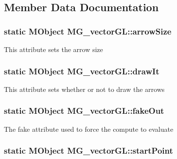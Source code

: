 \subsection{Member Data Documentation}
\hypertarget{class_m_g__vector_g_l_a51ce57b6d4cac43cf6b9fbdf377691c4}{
\subsubsection[{arrow\-Size}]{\setlength{\rightskip}{0pt plus 5cm}static M\-Object M\-G\-\_\-vector\-G\-L\-::arrow\-Size\hspace{0.3cm}{\ttfamily [static]}}}\label{class_m_g__vector_g_l_a51ce57b6d4cac43cf6b9fbdf377691c4}
This attribute sets the arrow size \hypertarget{class_m_g__vector_g_l_a5d59b4c3dfc50250558acfabca45a260}{
\subsubsection[{draw\-It}]{\setlength{\rightskip}{0pt plus 5cm}static M\-Object M\-G\-\_\-vector\-G\-L\-::draw\-It\hspace{0.3cm}{\ttfamily [static]}}}\label{class_m_g__vector_g_l_a5d59b4c3dfc50250558acfabca45a260}
This attribute sets whether or not to draw the arrows \hypertarget{class_m_g__vector_g_l_ac9e29eb01772ab64b67fe0ac130dceef}{
\subsubsection[{fake\-Out}]{\setlength{\rightskip}{0pt plus 5cm}static M\-Object M\-G\-\_\-vector\-G\-L\-::fake\-Out\hspace{0.3cm}{\ttfamily [static]}}}\label{class_m_g__vector_g_l_ac9e29eb01772ab64b67fe0ac130dceef}
The fake attribute used to force the compute to evaluate \hypertarget{class_m_g__vector_g_l_ac0ca586f36cae208f5fb0655d5f5a534}{
\subsubsection[{start\-Point}]{\setlength{\rightskip}{0pt plus 5cm}static M\-Object M\-G\-\_\-vector\-G\-L\-::start\-Point\hspace{0.3cm}{\ttfamily [static]}}}\label{class_m_g__vector_g_l_ac0ca586f36cae208f5fb0655d5f5a534}

